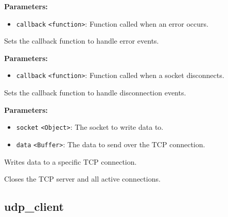 \documentclass[12pt,a4paper]{article}
\begin{document}
\vspace{5mm}
\noindent {}


\noindent \textbf{Parameters:}
\begin{itemize}
  \item \texttt{callback} \texttt{<function>}: Function called when an error occurs.
\end{itemize}

\noindent Sets the callback function to handle error events.

\vspace{5mm}
\noindent {}


\noindent \textbf{Parameters:}
\begin{itemize}
  \item \texttt{callback} \texttt{<function>}: Function called when a socket disconnects.
\end{itemize}

\noindent Sets the callback function to handle disconnection events.

\vspace{5mm}
\noindent {}


\noindent \textbf{Parameters:}
\begin{itemize}
  \item \texttt{socket} \texttt{<Object>}: The socket to write data to.
  \item \texttt{data} \texttt{<Buffer>}: The data to send over the TCP connection.
\end{itemize}

\noindent Writes data to a specific TCP connection.

\vspace{5mm}
\noindent {}


\noindent Closes the TCP server and all active connections.


\subsection{udp\_client}
\vspace{5mm}
\noindent {}
\end{document}

